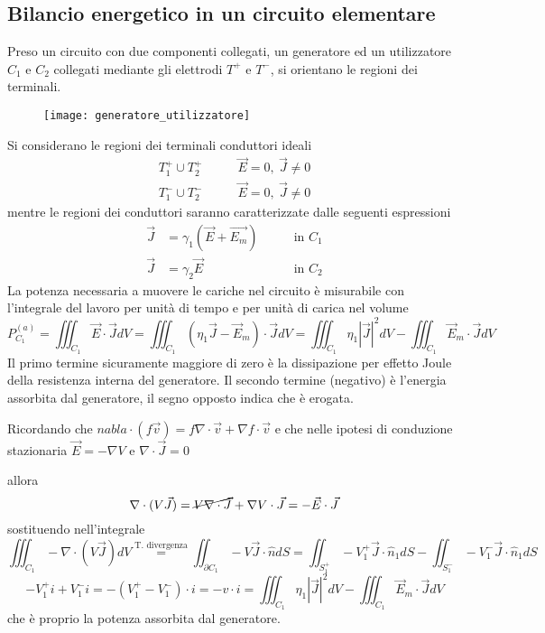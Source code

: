 \subsection{Bilancio energetico in un circuito elementare}
Preso un circuito con due componenti collegati, un generatore ed un utilizzatore $C_1$ e 
$C_2$ collegati mediante gli elettrodi $T^+$ e $T^-$, si orientano le regioni dei 
terminali. 
\begin{figure}[H]
\centering
\texttt{[image: generatore\_utilizzatore]}
\end{figure}
Si considerano le regioni dei terminali conduttori ideali
$$
\begin{aligned}
T_1^+ \cup T_2^+ &\qquad \vec{E} = 0,\ \vec{J} \neq 0\\
T_1^- \cup T_2^- &\qquad \vec{E} = 0,\ \vec{J} \neq 0
\end{aligned}
$$
mentre le regioni dei conduttori saranno caratterizzate dalle seguenti espressioni
$$
\begin{aligned}
\vec{J} &= \gamma_1 (\vec{E}+\vec{E_m}) \qquad &\text{in } C_1\\
\vec{J} &= \gamma_2\vec{E} \qquad &\text{in } C_2
\end{aligned}
$$
La potenza necessaria a muovere le cariche nel circuito è misurabile con l'integrale del lavoro per unità di tempo e per unità di carica nel volume
$$
P^{(a)}_{C_1} = \iiint_{C_1} \vec{E}\cdot\vec{J} dV = \iiint_{C_1} \left(\eta_1\vec{J} - 
\vec{E}_m\right)\cdot\vec{J} dV = \iiint_{C_1} \eta_1 |\vec{J}|^2dV - \iiint_{C_1} \vec{E}_m\cdot\vec{J}dV
$$
Il primo termine sicuramente maggiore di zero è la dissipazione per effetto Joule
della resistenza interna del generatore. Il secondo termine (negativo) è l'energia 
assorbita dal generatore, il segno opposto indica che è erogata.

Ricordando che $nabla\cdot(f\vec{v}) = f\nabla \cdot\vec{v} + \nabla f \cdot\vec{v}$ e che
nelle ipotesi di conduzione stazionaria $\vec{E} = -\nabla V $ e $\nabla\cdot\vec{J}= 0$

allora
$$
\nabla\cdot(V\vec{J}) = \cancel{V\nabla\cdot\vec{J}} + \nabla V \cdot \vec{J} = -\vec{E}\cdot\vec{J}
$$
sostituendo nell'integrale
$$
\iiint_{C_1} - \nabla\cdot(V\vec{J}) dV \stackrel{\text{T. divergenza}}{=} \iint_{\partial C_1} - V\vec{J}\cdot\hat{n}dS = \iint_{S_1^+}-V_1^+\vec{J}\cdot\hat{n}_1dS - \iint_{S_1^-}-V_1^-\vec{J}\cdot\hat{n}_1dS
$$
$$
-V_1^+ i + V_1^-i = -(V_1^+-V_1^-)\cdot i = - v\cdot i = \iiint_{C_1} \eta_1 |\vec{J}|^2dV - \iiint_{C_1} \vec{E}_m\cdot\vec{J}dV
$$
che è proprio la potenza assorbita dal generatore.


